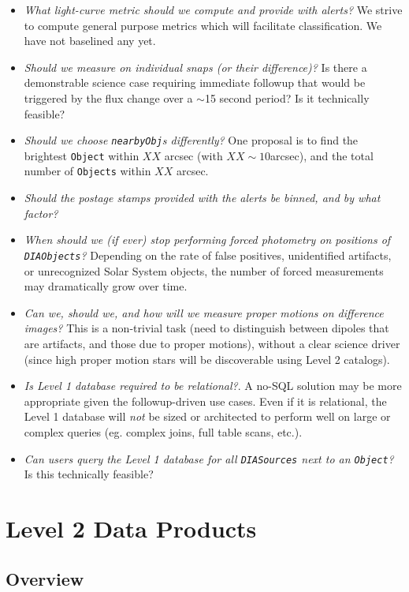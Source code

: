 \documentclass[12pt]{article}
\newcommand{\code}[1]{\texttt{#1}}
\newcommand{\DIASources}{\code{DIASources}\xspace}
\newcommand{\DIAObjects}{\code{DIAObjects}\xspace}
\newcommand{\DB}{{Level 1 database}\xspace}
\newcommand{\Object}{\code{Object}\xspace}
\newcommand{\Objects}{\code{Objects}\xspace}
\begin{document}
\begin{itemize}
    \item {\em What light-curve metric should we compute and provide with alerts?} We strive to compute general purpose metrics which will facilitate classification. We have not baselined any yet.
    \item {\em Should we measure on individual snaps (or their difference)?} Is there a demonstrable science case requiring immediate followup that would be triggered by the flux change over a $\sim$15 second period? Is it technically feasible?
    \item {\em Should we choose {\tt nearbyObj}s differently?} One proposal is to find the brightest \Object within $XX$ arcsec (with $XX \sim 10$arcsec), and the total number of \Objects within $XX$ arcsec.
    \item {\em Should the postage stamps provided with the alerts be binned, and by what factor?}
    \item {\em When should we (if ever) stop performing forced photometry on positions of \DIAObjects?} Depending on the rate of false positives, unidentified artifacts, or unrecognized Solar System objects, the number of forced measurements may dramatically grow over time.
    \item {\em Can we, should we, and how will we measure proper motions on difference images?} This is a non-trivial task (need to distinguish between dipoles that are artifacts, and those due to proper motions), without a clear science driver (since high proper motion stars will be discoverable using Level 2 catalogs).
    \item {\em Is \DB required to be relational?}. A no-SQL solution may be more appropriate given the followup-driven use cases. Even if it is relational, the Level 1 database will {\em not} be sized or architected to perform well on large or complex queries (eg. complex joins, full table scans, etc.).
    \item {\em Can users query the \DB for all \DIASources next to an \Object?} Is this technically feasible?

\end{itemize}

\clearpage

\section{Level 2 Data Products}

\subsection{Overview}
\end{document}
